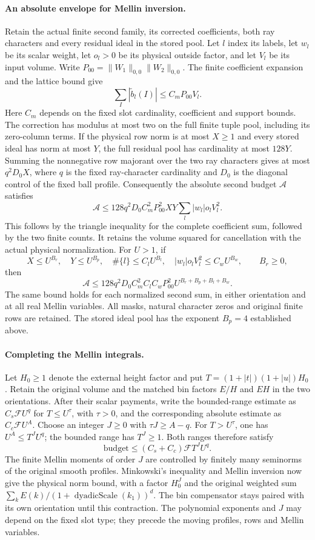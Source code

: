 \paragraph{An absolute envelope for Mellin inversion.}
Retain the actual finite second family, its corrected coefficients, both
ray characters and every residual ideal in the stored pool. Let \(l\)
index its labels, let \(w_l\) be its scalar weight, let \(o_l>0\) be
its physical outside factor, and let \(V_l\) be its input volume.
Write \(P_{00}=\|W_1\|_{0,0}\|W_2\|_{0,0}\).
The finite coefficient expansion and the lattice bound give
\[
 \sum_I |\widetilde b_l(I)|\le C_m P_{00}V_l.
\]
Here \(C_m\) depends on the fixed slot cardinality, coefficient and
support bounds. The correction has modulus at most two on the full
finite tuple pool, including its zero-column terms. If the physical
row norm is at most \(X\ge1\) and every stored ideal has norm at most
\(Y\), the full residual pool has cardinality at most \(128Y\).
Summing the nonnegative row majorant over the two ray characters gives
at most \(q^2D_0X\), where \(q\) is the fixed ray-character cardinality
and \(D_0\) is the diagonal control of the fixed ball profile.
Consequently the absolute second budget \(\mathcal A\) satisfies
\[
 \mathcal A\le128q^2D_0C_m^2P_{00}^2XY
       \sum_l |w_l|o_lV_l^2.
\]
This follows by the triangle inequality for the complete coefficient
sum, followed by the two finite counts. It retains the volume squared
for cancellation with the actual physical normalization.
For \(U>1\), if
\[
 X\le U^{B_r},\quad Y\le U^{B_p},\quad
 \#\{l\}\le C_lU^{B_l},\quad
 |w_l|o_lV_l^2\le C_wU^{B_w},\qquad B_r\ge0,
\]
then
\[
 \mathcal A\le128q^2D_0C_m^2C_lC_wP_{00}^2
                 U^{B_r+B_p+B_l+B_w}.
\]
The same bound holds for each normalized second sum, in either
orientation and at all real Mellin variables. All masks, natural
character zeros and original finite rows are retained. The stored
ideal pool has the exponent \(B_p=4\) established above.

\paragraph{Completing the Mellin integrals.}
Let \(H_0\ge1\) denote the external height factor and put
\(T=(1+|t|)(1+|u|)H_0\). Retain the original volume and the matched
bin factors \(E/H\) and \(EH\) in the two orientations. After their
scalar payments, write the bounded-range estimate as
\(C_s\mathcal F U^q\) for \(T\le U^\tau\), with \(\tau>0\),
and the corresponding absolute estimate as \(C_c\mathcal F U^A\).
Choose an integer \(J\ge0\) with \(\tau J\ge A-q\).
For \(T>U^\tau\), one has \(U^A\le T^JU^q\); the bounded range
has \(T^J\ge1\). Both ranges therefore satisfy
\[
 \text{budget}\le(C_s+C_c)\mathcal F T^JU^q.
\]
The finite Mellin moments of order \(J\) are controlled by finitely
many seminorms of the original smooth profiles. Minkowski's inequality
and Mellin inversion now give the physical norm bound, with a factor
\(H_0^J\) and the original weighted sum
\(\sum_k E(k)/(1+\operatorname{dyadicScale}(k_1))^d\).
The bin compensator stays paired with its own orientation until this
contraction. The polynomial exponents and \(J\) may depend on the fixed
slot type; they precede the moving profiles, rows and Mellin variables.


